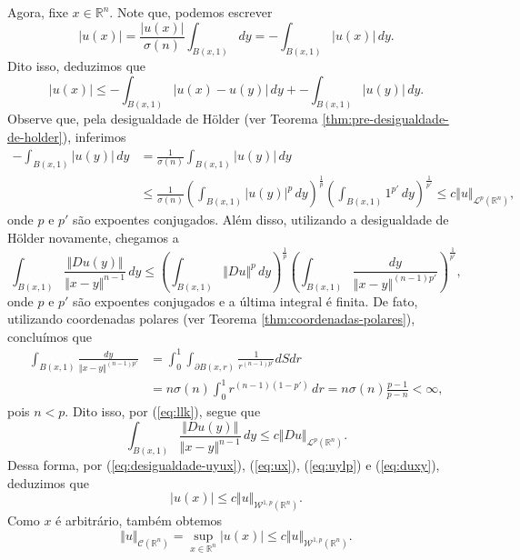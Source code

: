 \documentclass[a4paper, 11pt]{book}
\theoremstyle{definition}
\newcommand{\bR}{\mathbb{R}}
\newcommand{\cC}{\mathcal{C}}
\newcommand{\cL}{\mathcal{L}}
\newcommand{\cW}{\mathcal{W}}
\newcommand{\sint}{-\!\!\!\!\!\!\int}
\begin{document}
\begin{prf}
    Agora, fixe $x \in \bR^n$. Note que, podemos escrever
    \[
        |u(x)| = \frac{|u(x)|}{\sigma(n)}\int_{B(x,1)} dy = \sint_{B(x,1)} |u(x)| \,dy.
    \]
    Dito isso, deduzimos que
    \begin{equation} \label{eq:ux}
        |u(x)| \leqslant \sint_{B(x,1)} |u(x) - u(y)| \,dy + \sint_{B(x,1)} |u(y)|\,dy.
    \end{equation}
    Observe que, pela desigualdade de Hölder (ver Teorema \ref{thm:pre-desigualdade-de-holder}), inferimos
    \begin{equation} \label{eq:uylp}
        \begin{aligned}
            \sint_{B(x,1)} |u(y)| \,dy &= \frac{1}{\sigma(n)} \int_{B(x,1)} |u(y)| \,dy\\ 
            &\leqslant \frac{1}{\sigma(n)} \left( \int_{B(x,1)} |u(y)|^p\,dy \right)^{\frac{1}{p}} \left( \int_{B(x,1)} 1^{p'} \,dy \right)^{\frac{1}{p'}} \leqslant c \Vert u \Vert_{\cL^p(\bR^n)},
        \end{aligned}
    \end{equation}
    onde $p$ e $p'$ são expoentes conjugados.
    Além disso, utilizando a desigualdade de Hölder novamente, chegamos a
    \begin{equation} \label{eq:llk}
        \int_{B(x,1)} \frac{\Vert Du(y) \Vert}{\Vert x - y \Vert^{n-1}} \,dy \leqslant \left( \int_{B(x,1)} \Vert Du \Vert^p \,dy \right)^{\frac{1}{p}} \left( \int_{B(x,1)} \frac{dy}{\Vert x - y \Vert^{(n-1)p'}} \right)^{\frac{1}{p'}},
    \end{equation}
    onde $p$ e $p'$ são expoentes conjugados e a última integral é finita.
    De fato, utilizando coordenadas polares (ver Teorema \ref{thm:coordenadas-polares}), concluímos que
    \[
        \begin{aligned}
            \int_{B(x,1)} \frac{dy}{\Vert x - y \Vert^{(n-1)p'}} &= \int_0^1 \int_{\partial B(x,r)} \frac{1}{r^{(n-1)p'}} dSdr\\
            &= n\sigma(n)\int_0^1 r^{(n-1)(1-p')} \,dr = n \sigma(n)  \frac{p-1}{p-n} < \infty,
        \end{aligned}
    \]
    pois $n < p$.
    Dito isso, por (\ref{eq:llk}), segue que
    \begin{equation} \label{eq:duxy}
        \int_{B(x,1)} \frac{\Vert Du(y) \Vert}{\Vert x - y \Vert^{n-1}} \,dy \leqslant c\Vert Du \Vert_{\cL^p(\bR^n)}.
    \end{equation}
    Dessa forma, por (\ref{eq:desigualdade-uyux}), (\ref{eq:ux}), (\ref{eq:uylp}) e (\ref{eq:duxy}), deduzimos que
    \[
        |u(x)| \leqslant c \Vert u \Vert_{\cW^{1,p}(\bR^n)}.
    \]
    Como $x$ é arbitrário, também obtemos
    \begin{equation} \label{eq:normac}
        \Vert u \Vert_{\cC(\bR^n)} = \sup_{x \in \bR^n} |u(x)| \leqslant c \Vert u \Vert_{\cW^{1,p}(\bR^n)}.
    \end{equation}


\end{prf}
\end{document}
